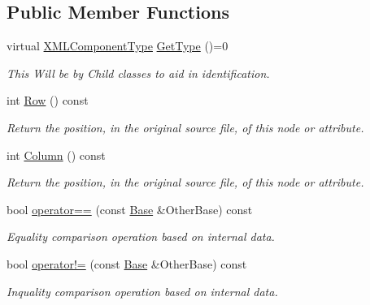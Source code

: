\subsection*{Public Member Functions}
\begin{DoxyCompactItemize}
\item 
virtual \hyperlink{classphys_1_1xml_1_1Base_a62ba0484b5ecb502f9ae9d82d3720320}{XMLComponentType} \hyperlink{classphys_1_1xml_1_1Base_af2821c239b5eb31c2524a499bf3ff19f}{GetType} ()=0
\begin{DoxyCompactList}\small\item\em This Will be by Child classes to aid in identification. \item\end{DoxyCompactList}\item 
int \hyperlink{classphys_1_1xml_1_1Base_adc2f732f1f37ef7bae5b701a84470754}{Row} () const 
\begin{DoxyCompactList}\small\item\em Return the position, in the original source file, of this node or attribute. \item\end{DoxyCompactList}\item 
int \hyperlink{classphys_1_1xml_1_1Base_a7ef4a2c8165c6bb63f75fdc9f2231948}{Column} () const 
\begin{DoxyCompactList}\small\item\em Return the position, in the original source file, of this node or attribute. \item\end{DoxyCompactList}\item 
bool \hyperlink{classphys_1_1xml_1_1Base_af5412e64fd83a5193e28a20df462b9a6}{operator==} (const \hyperlink{classphys_1_1xml_1_1Base}{Base} \&OtherBase) const 
\begin{DoxyCompactList}\small\item\em Equality comparison operation based on internal data. \item\end{DoxyCompactList}\item 
bool \hyperlink{classphys_1_1xml_1_1Base_a45216237a77d457ceda41f40583f80ac}{operator!=} (const \hyperlink{classphys_1_1xml_1_1Base}{Base} \&OtherBase) const 
\begin{DoxyCompactList}\small\item\em Inquality comparison operation based on internal data. \item\end{DoxyCompactList}\item 

\end{DoxyCompactItemize}
